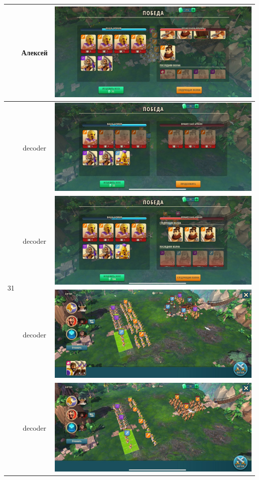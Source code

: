 \begin{longtable}{|c|c|c|}
    & Алексей &
    \includegraphics[width=0.75\linewidth]{./parts/media/TreasureHunt/30/alexey/photo_2022-04-07_14-26-29.jpg} \\
    \hline
    \multirow{8}{*}{31} & decoder &
    \includegraphics[width=0.75\linewidth]{./parts/media/TreasureHunt/31/decoder/photo_2022-04-07_10-00-46.jpg} \\
    & decoder &
    \includegraphics[width=0.75\linewidth]{./parts/media/TreasureHunt/31/decoder/photo_2022-04-07_09-59-58.jpg} \\
    & decoder &
    \includegraphics[width=0.75\linewidth]{./parts/media/TreasureHunt/31/decoder/photo_2022-04-07_09-59-48.jpg} \\
    & decoder &
    \includegraphics[width=0.75\linewidth]{./parts/media/TreasureHunt/31/decoder/photo_2022-04-07_10-00-36.jpg} \\

\end{longtable}
